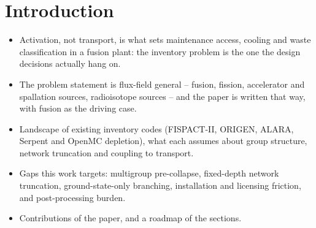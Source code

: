 
\section{Introduction}
\begin{itemize}
  \item Activation, not transport, is what sets maintenance access, cooling
        and waste classification in a fusion plant: the inventory problem is
        the one the design decisions actually hang on.
  \item The problem statement is flux-field general -- fusion, fission,
        accelerator and spallation sources, radioisotope sources -- and the
        paper is written that way, with fusion as the driving case.
  \item Landscape of existing inventory codes (FISPACT-II, ORIGEN, ALARA,
        Serpent and OpenMC depletion), what each assumes about group
        structure, network truncation and coupling to transport.
  \item Gaps this work targets: multigroup pre-collapse, fixed-depth network
        truncation, ground-state-only branching, installation and licensing
        friction, and post-processing burden.
  \item Contributions of the paper, and a roadmap of the sections.
\end{itemize}

